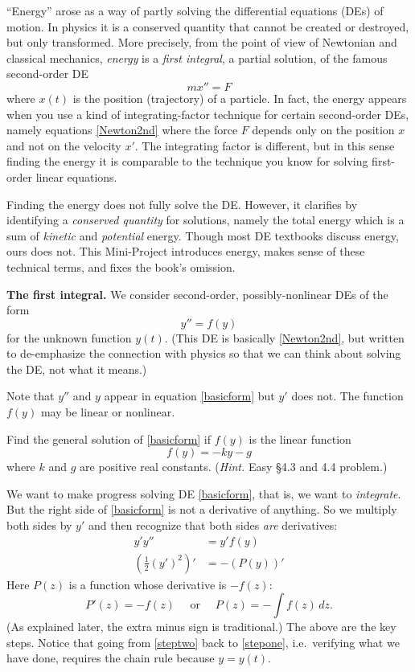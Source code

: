 \documentclass[12pt]{article}
\theoremstyle{definition}
\begin{document}
\normalsize
``Energy'' arose as a way of partly solving the differential equations (DEs) of motion.  In physics it is a conserved quantity that cannot be created or destroyed, but only transformed.  More precisely, from the point of view of Newtonian and classical mechanics, \emph{energy} is a \emph{first integral}, a partial solution, of the famous second-order DE
\begin{equation}
    mx''=F  \label{Newton2nd}
\end{equation}
where $x(t)$ is the position (trajectory) of a particle.  In fact, the energy appears when you use a kind of integrating-factor technique for certain second-order DEs, namely equations \eqref{Newton2nd} where the force $F$ depends only on the position $x$ and not on the velocity $x'$.  The integrating factor is different, but in this sense finding the energy it is comparable to the technique you know for solving first-order linear equations.

Finding the energy does not fully solve the DE.  However, it clarifies by identifying a \emph{conserved quantity} for solutions, namely the total energy which is a sum of \emph{kinetic} and \emph{potential} energy.  Though most DE textbooks discuss energy, ours does not.  This Mini-Project introduces energy, makes sense of these technical terms, and fixes the book's omission.

\medskip
\textbf{The first integral.}  We consider second-order, possibly-nonlinear DEs of the form
\begin{equation}
y'' = f(y) \label{basicform}
\end{equation}
for the unknown function $y(t)$.  (This DE is basically \eqref{Newton2nd}, but written to de-emphasize the connection with physics so that we can think about solving the DE, not what it means.)

Note that $y''$ and $y$ appear in equation \eqref{basicform} but $y'$ does not.  The function $f(y)$ may be linear or nonlinear.

\begin{exerpart}
Find the general solution of \eqref{basicform} if $f(y)$ is the linear function
    $$f(y) = -ky - g$$
where $k$ and $g$ are positive real constants.  (\emph{Hint.}  Easy \S 4.3 and 4.4 problem.)
\end{exerpart}

We want to make progress solving DE \eqref{basicform}, that is, we want to \emph{integrate}.  But the right side of \eqref{basicform} is not a derivative of anything.  So we multiply both sides by $y'$ and then recognize that both sides \emph{are} derivatives:
\begin{align}
y' y'' &= y' f(y) \label{stepone} \\
\left(\frac{1}{2} (y')^2\right)' &= - \left(P(y)\right)'  \label{steptwo}
\end{align}
Here $P(z)$ is a function whose derivative is $-f(z)$:
    $$P'(z)=-f(z) \quad \text{ or } \quad P(z) = -\int f(z)\,dz.$$
(As explained later, the extra minus sign is traditional.)  The above are the key steps.  Notice that going from \eqref{steptwo} back to \eqref{stepone}, i.e.~verifying what we have done, requires the chain rule because $y=y(t)$.
\end{document}
